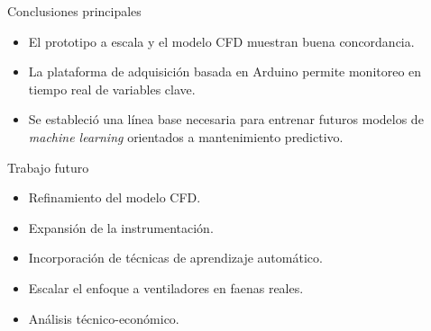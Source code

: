 \begin{frame}{Conclusiones principales}
    \begin{itemize}
      \item El prototipo a escala y el modelo CFD muestran buena concordancia.
      \item La plataforma de adquisición basada en Arduino permite monitoreo en tiempo real de variables clave.
      \item Se estableció una línea base necesaria para entrenar futuros modelos de \emph{machine learning} orientados a mantenimiento predictivo.
    \end{itemize}
\end{frame}

\begin{frame}{Trabajo futuro}
    \begin{itemize}
      \item Refinamiento del modelo CFD.
      \item Expansión de la instrumentación.
        \item Incorporación de técnicas de aprendizaje automático.
      \item Escalar el enfoque a ventiladores en faenas reales.
      \item Análisis técnico-económico.
    \end{itemize}
\end{frame}

%
